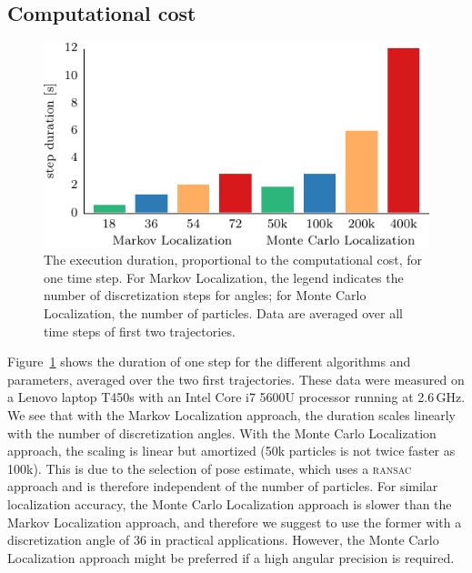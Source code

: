 \documentclass[letterpaper, 10pt, conference]{ieeeconf}
\newcommand{\Fig}[1]{Figure~\ref{fig:#1}}
\begin{document}
\subsection{Computational cost}

\begin{figure}
\includegraphics{cpu_load}
\caption{The execution duration, proportional to the computational cost, for one time step.
For Markov Localization, the legend indicates the number of discretization steps for angles; for Monte Carlo Localization, the number of particles.
Data are averaged over all time steps of first two trajectories.}
\label{fig:cpuload}
\end{figure}

\Fig{cpuload} shows the duration of one step for the different algorithms and parameters, averaged over the two first trajectories.
These data were measured on a Lenovo laptop T450s with an Intel Core i7 5600U processor running at 2.6\,GHz.
We see that with the Markov Localization approach, the duration scales linearly with the number of discretization angles.
With the Monte Carlo Localization approach, the scaling is linear but amortized (50k particles is not twice faster as 100k).
This is due to the selection of pose estimate, which uses a \textsc{ransac} approach and is therefore independent of the number of particles.
For similar localization accuracy, the Monte Carlo Localization approach is slower than the Markov Localization approach, and therefore we suggest to use the former with a discretization angle of 36 in practical applications.
However, the Monte Carlo Localization approach might be preferred if a high angular precision is required.
\end{document}
